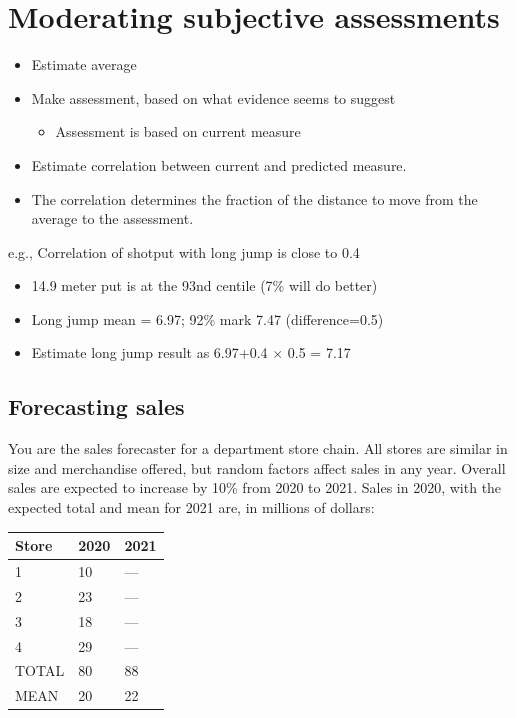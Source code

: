 \documentclass[
  10pt,
  b5paper]{book}
\providecommand{\tightlist}{%
  \setlength{\itemsep}{0pt}\setlength{\parskip}{0pt}}
\begin{document}
\hypertarget{moderating-subjective-assessments}{%
\section{Moderating subjective assessments}\label{moderating-subjective-assessments}}

\begin{itemize}
\tightlist
\item
  Estimate average
\item
  Make assessment, based on what evidence seems to suggest

  \begin{itemize}
  \tightlist
  \item
    Assessment is based on current measure
  \end{itemize}
\item
  Estimate correlation between current and predicted measure.
\item
  The correlation determines the fraction of the distance
  to move from the average to the assessment.
\end{itemize}

e.g., Correlation of shotput with long jump is close to 0.4

\begin{itemize}
\tightlist
\item
  14.9 meter put is at the 93nd centile (7\% will do better)
\item
  Long jump mean = 6.97; 92\% mark 7.47 (difference=0.5)
\item
  Estimate long jump result as 6.97+0.4 \(\times\) 0.5 = 7.17
\end{itemize}

\hypertarget{forecasting-sales}{%
\subsection*{Forecasting sales}\label{forecasting-sales}}

You are the sales forecaster for a department store chain.
All stores are similar in size and merchandise offered,
but random factors affect sales in any year. Overall sales
are expected to increase by 10\% from 2020 to 2021. Sales
in 2020, with the expected total and mean for 2021 are,
in millions of dollars:

\begin{longtable}[]{@{}lll@{}}
\toprule
Store & 2020 & 2021 \\
\midrule
\endhead
1 & 10 & --- \\
2 & 23 & --- \\
3 & 18 & --- \\
4 & 29 & --- \\
TOTAL & 80 & 88 \\
MEAN & 20 & 22 \\
\bottomrule
\end{longtable}
\end{document}
